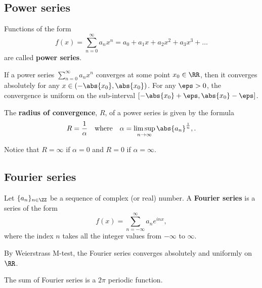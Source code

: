 \documentclass[12pt, a4paper]{article}
\begin{document}
\subsection{Power series}

\begin{definition}
    Functions of the form 
    \[f(x)=\sum_{n=0}^{\infty} a_n x^n = a_0 +a_1 x +a_2 x^2 +a_3 x^3 +\ldots\]
    are called \textbf{power series}.
\end{definition}

\begin{mdthm}
    If a power series \(\sum_{n=0}^{\infty} a_n x^n\) converges at some point \(x_0 \in \RR\), then it converges absolutely for any \(x \in (-\abs{x_0},\abs{x_0})\). For any \(\eps>0\), the convergence is uniform on the sub-interval \([-\abs{x_0}+\eps,\abs{x_0}-\eps]\).
\end{mdthm}

\begin{mdthm}
    The \textbf{radius of convergence}, \(R\), of a power series is given by the formula 
    \[R =\frac{1}{\alpha} \quad \text{where} \quad \alpha = \limsup_{n\to \infty} \abs{a_n}^{\frac{1}{n}},.\]
\end{mdthm}

\begin{mdremark}
    Notice that \(R=\infty\) if \(\alpha=0\) and \(R=0\) if \(\alpha=\infty\).
\end{mdremark}

\subsection{Fourier series}

\begin{definition}
    Let \(\{a_n\}_{n\in \ZZ}\) be a sequence of complex (or real) number. A \textbf{Fourier series} is a series of the form 
    \[f(x)=\sum_{n=-\infty}^{\infty} a_n  e^{inx},\]
    where the index \(n\) takes all the integer values from \(-\infty\) to \(\infty\).
\end{definition}

\begin{mdthm}
    By Weierstrass M-test, the Fourier series converges absolutely and uniformly on \(\RR\).
\end{mdthm}

\begin{theorem}
    The sum of Fourier series is a \(2\pi\) periodic function.
\end{theorem}
\end{document}
